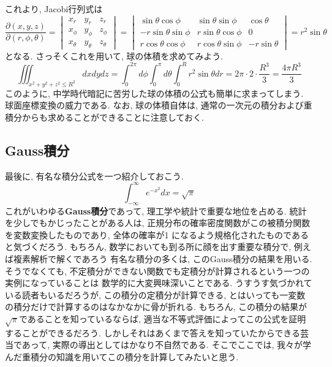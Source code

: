 \documentclass[a4j,dvipdfmx]{jsarticle}
\numberwithin{equation}{section}
\begin{document}
            これより, Jacobi行列式は
            \begin{equation*}
                \frac{\partial(x,y,z)}{\partial(r,\phi,\theta)}=
                \begin{vmatrix}
                    x_r & y_r & z_r \\
                    x_\phi & y_\phi & z_\phi\\
                    x_\theta & y_\theta & z_\theta
                \end{vmatrix}
                =
                \begin{vmatrix}
                    \sin\theta\cos\phi & \sin\theta\sin\phi & \cos\theta \\
                    -r\sin\theta\sin\phi & r\sin\theta\cos\phi & 0\\
                    r\cos\theta\cos\phi & r\cos\theta\sin\phi & -r\sin\theta
                \end{vmatrix}
                =r^2\sin\theta \label{eq:多重積分:球面座標のヤコビアン}
            \end{equation*}
            となる. さっそくこれを用いて, 球の体積を求めてみよう.
            \begin{equation*}
                \iiint_{x^2+y^2+z^2\leq R^2}dxdydz=\int_{0}^{2\pi}d\phi\int_{0}^{\pi}d\theta\int_{0}^{R}r^2\sin\theta dr=2\pi\cdot 2\cdot \frac{R^3}{3}=\frac{4\pi R^3}{3}
            \end{equation*}
            このように, 中学時代暗記に苦労した球の体積の公式も簡単に求まってしまう. 球面座標変換の威力である. なお, 球の体積自体は, 通常の一次元の積分および重積分からも求めることができることに注意しておく.
        \clearpage
        \subsection{Gauss積分}
            最後に, 有名な積分公式を一つ紹介しておこう.
            \begin{equation}
                \int_{-\infty}^{\infty}e^{-x^2}dx = \sqrt{\pi}\label{eq:多重積分:ガウス積分}
            \end{equation}
            これがいわゆる\textbf{Gauss積分}であって, 理工学や統計で重要な地位を占める. 
            統計を少しでもかじったことがある人は, 正規分布の確率密度関数がこの被積分関数を変数変換したものであり, 全体の確率が1
            になるよう規格化されたものであると気づくだろう. もちろん, 数学においても到る所に顔を出す重要な積分で, 例えば複素解析で解くであろう
            有名な積分の多くは, このGauss積分の結果を用いる. そうでなくても, 不定積分ができない関数でも定積分が計算されるという一つの実例になっていることは
            数学的に大変興味深いことである. うすうす気づかれている読者もいるだろうが, この積分の定積分が計算できる, とはいっても一変数の積分だけで計算するのはなかなかに骨が折れる.
            もちろん, この積分の結果が$\sqrt{\pi}$であることを知っているならば, 適当な不等式評価によってこの公式を証明することができるだろう.
            しかしそれはあくまで答えを知っていたからできる芸当であって, 実際の導出としてはかなり不自然である. そこでここでは, 我々が学んだ重積分の知識を用いてこの積分を計算してみたいと思う.
\end{document}

